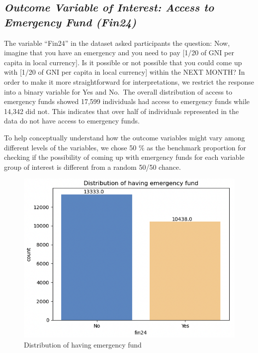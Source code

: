 \documentclass[12pt]{article}
\begin{document}
\hypertarget{outcome-variable-of-interest-access-to-emergency-fund-fin24}{%
\subsection{\texorpdfstring{\emph{Outcome Variable of Interest: Access
to Emergency Fund
(Fin24)}}{Outcome Variable of Interest: Access to Emergency Fund (Fin24)}}\label{outcome-variable-of-interest-access-to-emergency-fund-fin24}}

The variable ``Fin24'' in the dataset asked participants the question:
Now, imagine that you have an emergency and you need to pay {[}1/20 of
GNI per capita in local currency{]}. Is it possible or not possible that
you could come up with {[}1/20 of GNI per capita in local currency{]}
within the NEXT MONTH\citep{Demirguc-Kunt2022}? In order to make it more
straightforward for interpretations, we restrict the response into a
binary variable for Yes and No.~The overall distribution of access to
emergency funds showed 17,599 individuals had access to emergency funds
while 14,342 did not. This indicates that over half of individuals
represented in the data do not have access to emergency funds.

To help conceptually understand how the outcome variables might vary
among different levels of the variables, we chose 50 \% as the benchmark
proportion for checking if the possibility of coming up with emergency
funds for each variable group of interest is different from a random
50/50 chance.

\begin{figure}

{\centering \includegraphics[width=0.7\linewidth]{graphs/f24_graph1} 

}

\caption{Distribution of having emergency fund}\label{fig:unnamed-chunk-4}
\end{figure}
\end{document}
